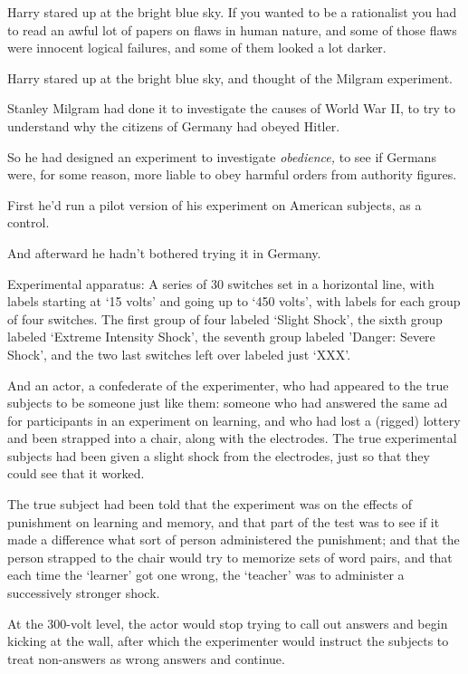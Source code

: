 Harry stared up at the bright blue sky. If you wanted to be a rationalist you 
had to read an awful lot of papers on flaws in human nature, and some of those 
flaws were innocent logical failures, and some of them looked a lot darker.

Harry stared up at the bright blue sky, and thought of the Milgram experiment.

Stanley Milgram had done it to investigate the causes of World War II, to try 
to understand why the citizens of Germany had obeyed Hitler.

So he had designed an experiment to investigate \emph{obedience,} to see if 
Germans were, for some reason, more liable to obey harmful orders from 
authority figures.

First he'd run a pilot version of his experiment on American subjects, as a 
control.

And afterward he hadn't bothered trying it in Germany.

Experimental apparatus: A series of 30 switches set in a horizontal line, with 
labels starting at `15 volts' and going up to `450 volts', with labels for each 
group of four switches. The first group of four labeled `Slight Shock', the 
sixth group labeled `Extreme Intensity Shock', the seventh group labeled 
'Danger: Severe Shock', and the two last switches left over labeled just `XXX'.

And an actor, a confederate of the experimenter, who had appeared to the true 
subjects to be someone just like them: someone who had answered the same ad for 
participants in an experiment on learning, and who had lost a (rigged) lottery 
and been strapped into a chair, along with the electrodes. The true 
experimental subjects had been given a slight shock from the electrodes, just 
so that they could see that it worked.

The true subject had been told that the experiment was on the effects of 
punishment on learning and memory, and that part of the test was to see if it 
made a difference what sort of person administered the punishment; and that the 
person strapped to the chair would try to memorize sets of word pairs, and that 
each time the `learner' got one wrong, the `teacher' was to administer a 
successively stronger shock.

At the 300-volt level, the actor would stop trying to call out answers and 
begin kicking at the wall, after which the experimenter would instruct the 
subjects to treat non-answers as wrong answers and continue.


